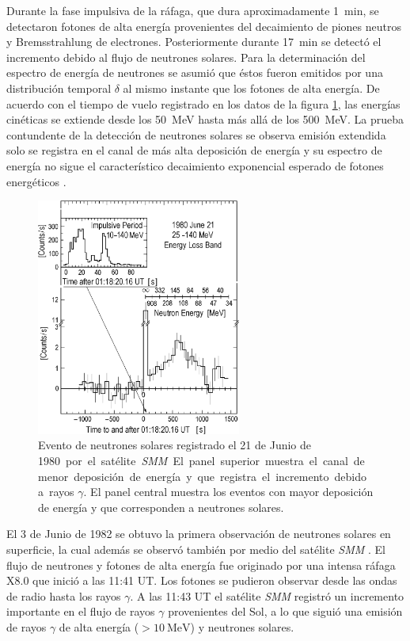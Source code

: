 Durante la fase impulsiva de la ráfaga, que dura aproximadamente \SI{1}{\minute}, se detectaron fotones de alta energía provenientes del decaimiento de piones neutros y Bremsstrahlung de electrones. Posteriormente durante \SI{17}{\minute} se detectó el incremento debido al flujo de neutrones solares. Para la determinación del espectro de energía de neutrones se asumió que éstos fueron emitidos por una distribución temporal $\delta$ al mismo instante que los fotones de alta energía. De acuerdo con el tiempo de vuelo registrado en los datos de la figura \ref{fig:solar-neutrons}, las energías cinéticas se extiende desde los \SI{50}{\mega\electronvolt} hasta más allá de los \SI{500}{\mega\electronvolt}. La prueba contundente de la detección de neutrones solares se observa emisión extendida solo se registra en el canal de más alta deposición de energía y su espectro de energía no sigue el característico decaimiento exponencial esperado de fotones energéticos \cite{dorman}.

\begin{figure}
        \centering
        \includegraphics[width=0.6\textwidth]{solar-neutrons.png}
        \caption{Evento de neutrones solares registrado el \num{21} de Junio de \SI{1980} por el satélite \emph{SMM}. El panel superior muestra el canal de menor deposición de energía y que registra el incremento debido a rayos $\gamma$. El panel central muestra los eventos con mayor deposición de energía y que corresponden a neutrones solares.}
        \label{fig:solar-neutrons}
\end{figure}

El \num{3} de Junio de \num{1982} se obtuvo la primera observación de neutrones solares en superficie, la cual además se observó también por medio del satélite \emph{SMM} \cite{debrunner83}. El flujo de neutrones y fotones de alta energía fue originado por una intensa ráfaga X8.0 que inició a las 11:41 UT. Los fotones se pudieron observar desde las ondas de radio hasta los rayos $\gamma$. A las 11:43 UT el satélite \emph{SMM} registró un incremento importante en el flujo de rayos $\gamma$ provenientes del Sol, a lo que siguió una emisión de rayos $\gamma$ de alta energía ($>\SI{10}{\mega\electronvolt}$) y neutrones solares.

